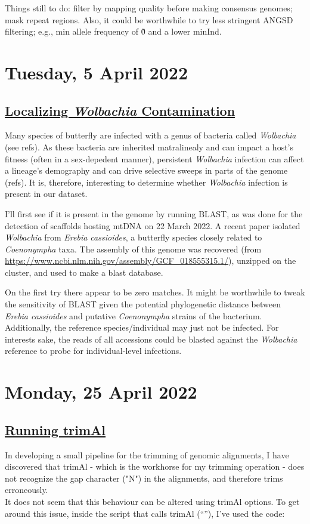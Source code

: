 \documentclass[12pt]{report}
\begin{document}
Things still to do: filter by mapping quality before making consensus genomes; mask repeat regions. Also, it could be worthwhile to try less stringent ANGSD filtering; e.g., min allele frequency of \~0 and a lower minInd.

\section*{Tuesday, 5 April 2022}
\subsection*{\underline{Localizing \emph{Wolbachia} Contamination}}
Many species of butterfly are infected with a genus of bacteria called \emph{Wolbachia} (see refs). As these bacteria are inherited matralinealy and can impact a host's fitness (often in a sex-depedent manner), persistent \emph{Wolbachia} infection can affect a lineage's demography and can drive selective sweeps in parts of the genome (refs). It is, therefore, interesting to determine whether \emph{Wolbachia} infection is present in our dataset.

I'll first see if it is present in the genome by running BLAST, as was done for the detection of scaffolds hosting mtDNA on 22 March 2022. A recent paper \cite{lucek2021} isolated \emph{Wolbachia} from \emph{Erebia cassioides}, a butterfly species closely related to \emph{Coenonympha} taxa. The assembly of this genome was recovered (from \url{https://www.ncbi.nlm.nih.gov/assembly/GCF_018555315.1/}), unzipped on the cluster, and used to make a blast database.

On the first try there appear to be zero matches. It might be worthwhile to tweak the sensitivity of BLAST given the potential phylogenetic distance between \emph{Erebia cassioides} and putative \emph{Coenonympha} strains of the bacterium. Additionally, the reference species/individual may just not be infected. For interests sake, the reads of all accessions could be blasted against the \emph{Wolbachia} reference to probe for individual-level infections.


\section*{Monday, 25 April 2022}
\subsection*{\underline{Running trimAl}}
In developing a small pipeline for the trimming of genomic alignments, I have discovered that trimAl - which is the workhorse for my trimming operation - does not recognize the gap character ("N") in the alignments, and therefore trims erroneously. \\
It does not seem that this behaviour can be altered using trimAl options. To get around this issue, inside the script that calls trimAl (``''), I've used the code:
\end{document}
